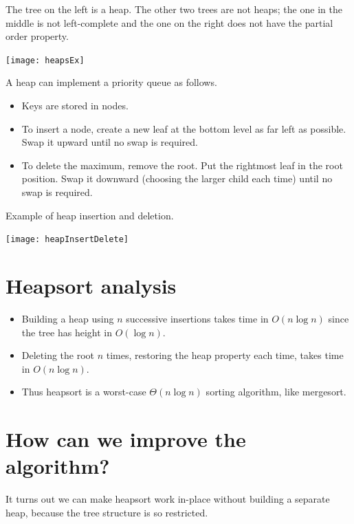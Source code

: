 \begin{Boxample}
The tree on the left is a heap. The other two trees are not heaps; 
the one in the middle is not left-complete and the one on the right does not have the partial order property.
\begin{center}
\texttt{[image: heapsEx]}
\end{center}
\end{Boxample}

A heap can implement a priority queue as follows. 
\begin{itemize}
\item Keys are stored in nodes. 
\item To insert a node, create a new leaf at the bottom level as far left as 
possible. Swap it upward until no swap is required. 
\item To delete the maximum, remove the root. Put the rightmost leaf in the root
 position. Swap it downward (choosing the larger child each time) until no swap 
is required. 
\end{itemize}

\begin{Boxample}
Example of heap insertion and deletion. 
\begin{center}
\texttt{[image: heapInsertDelete]}
\end{center}
\end{Boxample}

\section{Heapsort analysis}
\begin{itemize}
\item Building a heap using $n$ successive insertions takes time in 
$O(n\log n)$ since the tree has height in $O(\log n)$.
\item Deleting the root $n$ times, restoring the heap property each time, takes
 time in $O(n \log n)$.
\item Thus heapsort is a worst-case $\Theta(n \log n)$ sorting algorithm, like 
mergesort. 
\end{itemize}

\section{How can we improve the algorithm?}
It turns out we can make heapsort work in-place without building a separate heap, 
because the tree structure is so restricted.

